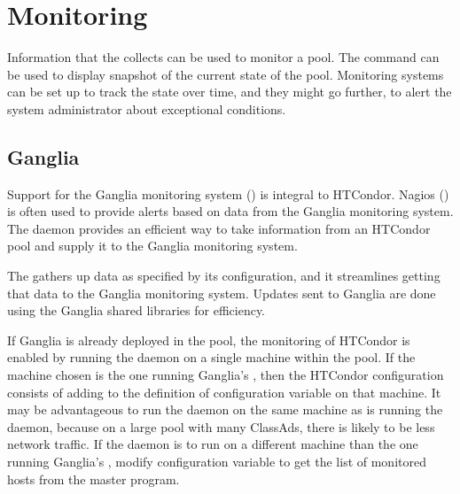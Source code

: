 \section{Monitoring}\label{sec:Monitoring}

Information that
the  collects can be used to monitor a pool.
The  command can be used to display
snapshot of the current state of the pool.
Monitoring systems can be set up to track the state over time,
and they might go further, 
to alert the system administrator about exceptional conditions.


\subsection{\label{sec:monitor-ganglia}Ganglia}

Support for the Ganglia monitoring system ()
is integral to HTCondor.
Nagios ()
is often used to provide alerts based on data from the Ganglia
monitoring system.
The  daemon provides an efficient way to take information from
an HTCondor pool and supply it to the Ganglia monitoring system.

The  gathers up data as specified by its configuration,
and it streamlines getting that data to the Ganglia monitoring
system.
Updates sent to Ganglia are done using the Ganglia shared libraries for
efficiency.

If Ganglia is already deployed in the pool,
the monitoring of HTCondor is enabled by running the  daemon
on a single machine within the pool.
If the machine chosen is the one running Ganglia's ,
then the HTCondor configuration consists of
adding  to the definition of configuration
variable  on that machine.
It may be advantageous to run the  daemon
on the same machine as is running the  daemon,
because on a large pool with many ClassAds,
there is likely to be less network traffic.
If the  daemon is to run on a different machine
than the one running Ganglia's ,
modify configuration variable  to get the
list of monitored hosts from the master  program.

